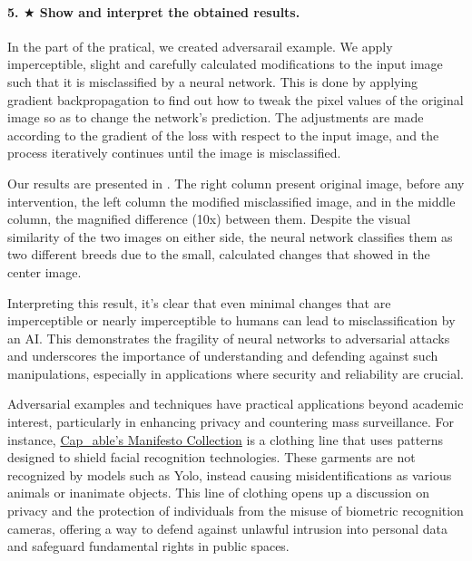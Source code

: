 \paragraph*{5. $ \bigstar $ Show and interpret the obtained results.}

In the part of the pratical, we created adversarail example. We apply imperceptible, slight and carefully calculated modifications to the input image such that it is misclassified by a neural network. This is done by applying gradient backpropagation to find out how to tweak the pixel values of the original image so as to change the network's prediction. The adjustments are made according to the gradient of the loss with respect to the input image, and the process iteratively continues until the image is misclassified.

Our results are presented in . The right column present original image, before any intervention, the left column the modified misclassified image, and in the middle column, the magnified difference (10x) between them. Despite the visual similarity of the two images on either side, the neural network classifies them as two different breeds due to the small, calculated changes that showed in the center image.

Interpreting this result, it's clear that even minimal changes that are imperceptible or nearly imperceptible to humans can lead to misclassification by an AI. This demonstrates the fragility of neural networks to adversarial attacks and underscores the importance of understanding and defending against such manipulations, especially in applications where security and reliability are crucial.

Adversarial examples and techniques have practical applications beyond academic interest, particularly in enhancing privacy and countering mass surveillance. For instance, \href{https://www.capable.design}{Cap\_able's Manifesto Collection} is a clothing line that uses patterns designed to shield facial recognition technologies. These garments are not recognized by models such as Yolo, instead causing misidentifications as various animals or inanimate objects. This line of clothing opens up a discussion on privacy and the protection of individuals from the misuse of biometric recognition cameras, offering a way to defend against unlawful intrusion into personal data and safeguard fundamental rights in public spaces.


